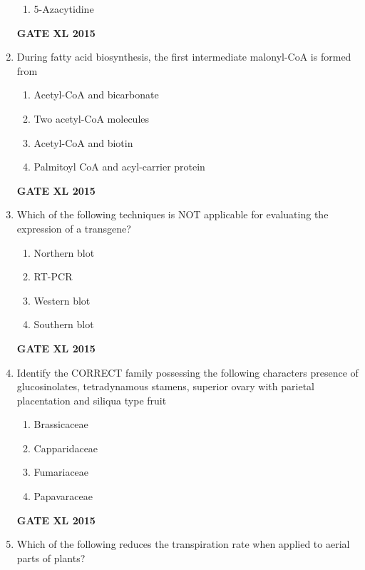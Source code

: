 \documentclass[journal,12pt,onecolumn]{IEEEtran}
\begin{document}
\begin{enumerate}
\begin{enumerate}
            \item 5-Azacytidine
    \end{enumerate}
\begin{flushright}\textbf{GATE XL 2015}\end{flushright}
\item During fatty acid biosynthesis, the first intermediate malonyl-CoA is formed from 
    \begin{enumerate}
            \item Acetyl-CoA and bicarbonate
	    \item Two acetyl-CoA molecules
	    \item Acetyl-CoA and biotin
            \item  Palmitoyl CoA and acyl-carrier protein 
	\end{enumerate}
\begin{flushright}\textbf{GATE XL 2015}\end{flushright}
\item  Which of the following techniques is NOT applicable for evaluating the expression of a transgene?
        \begin{enumerate} 
            \item Northern blot
	    \item RT-PCR
	    \item Western blot
            \item Southern blot
	\end{enumerate}
\begin{flushright}\textbf{GATE XL 2015}\end{flushright}
\item Identify the CORRECT family possessing the following characters presence of glucosinolates, tetradynamous stamens, superior ovary with parietal placentation and siliqua type fruit
        \begin{enumerate} 
            \item Brassicaceae
	    \item Capparidaceae
	    \item Fumariaceae
            \item Papavaraceae
    \end{enumerate}
\begin{flushright}\textbf{GATE XL 2015}\end{flushright}
\item Which of the following reduces the transpiration rate when applied to aerial parts of plants?
    \begin{enumerate}

\end{enumerate}
\end{enumerate}
\end{document}
